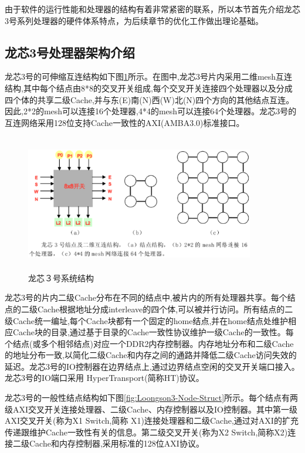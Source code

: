 

由于软件的运行性能和处理器的结构有着非常紧密的联系，所以本节首先介绍龙芯3号系列处理器的硬件体系特点，为后续章节的优化工作做出理论基础。

\subsection{龙芯3号处理器架构介绍\cite{Loongson3A-Manual}}

龙芯3号的可伸缩互连结构如下图\ref{fig:Loongson3-System-Struct}所示。在图中,龙芯3号片内采用二维mesh互连结构,其中每个结点由8*8的交叉开关组成,每个交叉开关连接四个处理器以及分成四个体的共享二级Cache,并与东(E)南(N)西(W)北(N)四个方向的其他结点互连。因此,2*2的mesh可以连接16个处理器,4*4的mesh可以连接64个处理器。龙芯3号的互连网络采用128位支持Cache一致性的AXI(AMBA3.0)标准接口。

\begin{figure}[H] 
  \centering
  \includegraphics[width=10cm,height=6cm]{figures/chap02/Loongson3-System-Struct}
  \caption{龙芯３号系统结构}
  \label{fig:Loongson3-System-Struct}
\end{figure}

龙芯3号的片内二级Cache分布在不同的结点中,被片内的所有处理器共享。每个结点的二级Cache根据地址分成interleave的四个体,可以被并行访问。所有结点的二级Cache统一编址,每个Cache块都有一个固定的home结点,并在home结点处维护相应Cache块的目录,通过基于目录的Cache一致性协议维护一级Cache的一致性。每个结点(或多个相邻结点)对应一个DDR2内存控制器。内存地址分布和二级Cache的地址分布一致,以简化二级Cache和内存之间的通路并降低二级Cache访问失效的延迟。龙芯3号的IO控制器在边界结点上,通过边界结点空闲的交叉开关端口接入。龙芯3号的IO端口采用 HyperTransport(简称HT)协议。

龙芯3号的一般性结点结构如下图\ref{fig:Loongson3-Node-Struct}所示。每个结点有两级AXI交叉开关连接处理器、二级Cache、内存控制器以及IO控制器。其中第一级AXI交叉开关(称为X1 Switch,简称 X1)连接处理器和二级Cache,通过对AXI的扩充传递跟维护Cache一致性有关的信息。第二级交叉开关(称为X2 Switch,简称X2)连接二级Cache和内存控制器,采用标准的128位AXI协议。

